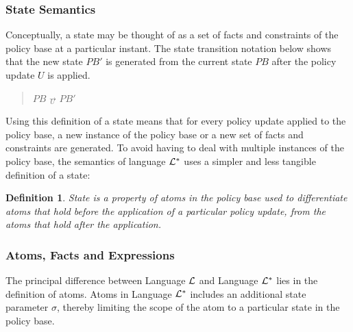\documentclass[10pt, twocolumn]{article}
\newtheorem{definition}{Definition}
\begin{document}
      \subsubsection{State Semantics}

        Conceptually, a state may be thought of as a set of facts and
        constraints of the policy base at a particular instant. The state
        transition notation below shows that the new state $PB'$ is generated
        from the current state $PB$ after the policy update $U$ is applied.

        \begin{quote}
          $PB$ $\overrightarrow{_{U}}$ $PB'$
        \end{quote}

        Using this definition of a state means that for every policy update
        applied to the policy base, a new instance of the policy base or a new 
        set of facts and constraints are generated. To avoid having to deal
        with multiple instances of the policy base, the semantics of language
        ${\cal L}^{*}$ uses a simpler and less tangible definition of a state:

        \begin{definition}
          State is a property of atoms in the policy base used to differentiate
          atoms that hold before the application of a particular policy update,
          from the atoms that hold after the application.
        \end{definition}

      \subsubsection{Atoms, Facts and Expressions}

        The principal difference between Language ${\cal L}$ and Language
        ${\cal L}^{*}$ lies in the definition of atoms. Atoms in Language
        ${\cal L}^{*}$ includes an additional state parameter $\sigma$, thereby
        limiting the scope of the atom to a particular state in the policy
        base.
\end{document}
